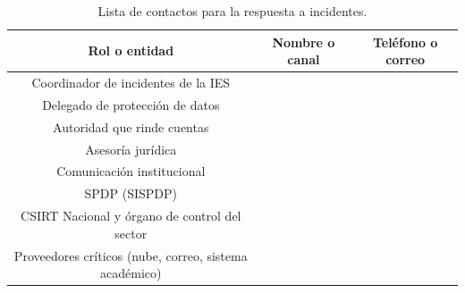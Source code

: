 \documentclass[11pt,a4paper,oneside]{report}
\begin{document}
\begin{table}[htbp]
  \centering
  \caption{Lista de contactos para la respuesta a incidentes.}
  \label{tab:contactos}
  \small
  \begin{tabular}{|C{0.38}|C{0.31}|C{0.31}|}
    \hline
    \textbf{Rol o entidad} & \textbf{Nombre o canal} & \textbf{Teléfono o correo} \\
    \hline
    Coordinador de incidentes de la IES & & \\
    \hline
    Delegado de protección de datos & & \\
    \hline
    Autoridad que rinde cuentas & & \\
    \hline
    Asesoría jurídica & & \\
    \hline
    Comunicación institucional & & \\
    \hline
    SPDP (SISPDP) & & \\
    \hline
    CSIRT Nacional y órgano de control del sector & & \\
    \hline
    Proveedores críticos (nube, correo, sistema académico) & & \\
    \hline
  \end{tabular}
\end{table}



\end{document}
